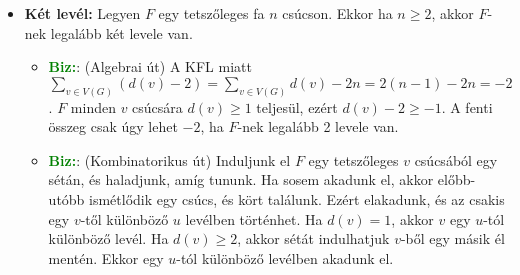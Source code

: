 \documentclass[../../szobeli.tex]{subfiles}
\begin{document}
    \begin{itemize}
        \item \textbf{Két levél:} Legyen $F$ egy tetszőleges fa $n$ csúcson. Ekkor ha $n \geq 2$, akkor $F$-nek legalább két levele van.
        \begin{itemize}
            \item \textcolor{green}{\textbf{Biz:}}: (Algebrai út) A KFL miatt $\sum_{v\in V(G)}(d(v)-2)=\sum_{v\in V(G)}d(v)-2n=2(n-1)-2n=-2$. $F$ minden $v$ csúcsára $d(v) \geq 1$ teljesül, ezért $d(v) - 2 \geq -1$. A fenti összeg csak úgy lehet $-2$, ha $F$-nek legalább 2 levele van.
            \item \textcolor{green}{\textbf{Biz:}}: (Kombinatorikus út) Induljunk el $F$ egy tetszőleges $v$ csúcsából egy sétán, és haladjunk, amíg tununk. Ha sosem akadunk el, akkor előbb-utóbb ismétlődik egy csúcs, és kört találunk. Ezért elakadunk, és az csakis egy $v$-től különböző $u$ levélben történhet. Ha $d(v)=1$, akkor $v$ egy $u$-tól különböző levél. Ha $d(v) \geq 2$, akkor sétát indulhatjuk $v$-ből egy másik él mentén. Ekkor egy $u$-tól különböző levélben akadunk el.
        \end{itemize}
    \end{itemize}
\end{document}

